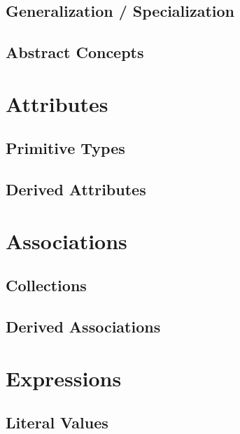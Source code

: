 \documentclass[a4paper,oneside,12pt, extrafontsizes]{memoir}
\theoremstyle{definition}
\theoremstyle{definition}
\theoremstyle{definition}
\theoremstyle{definition}
\theoremstyle{definition}
\begin{document}
\section{Generalization / Specialization}
\label{sec:generalization}


\section{Abstract Concepts}
\label{sec:abstract}


\chapter{Attributes}
\label{ch:attributes}


\section{Primitive Types}
\label{sec:primitive-types}

\section{Derived Attributes}
\label{sec:derived-attributes}

\chapter{Associations}
\label{ch:associations}


\section{Collections}
\label{sec:collections}

\section{Derived Associations}
\label{sec:derived-associations}

\chapter{Expressions}
\label{ch:expressions}


\section{Literal Values}
\label{sec:literals}

\end{document}
